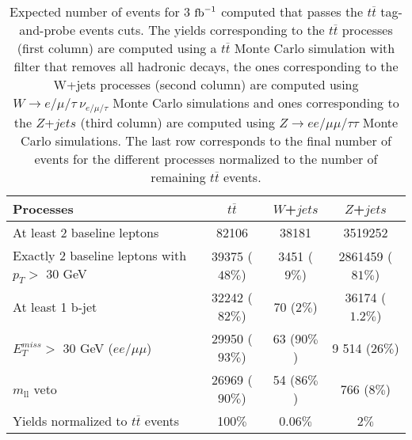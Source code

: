\begin{table}[htb!]
  	\begin{center} 
    		\begin{tabular}{|l|c|c|c|} \hline
				Processes    &   $t\overline{t}$  &  $W$+$jets$   &  $Z$+$jets$ \\ \hline \hline
				At least 2 baseline leptons & 82106 & 38181  & 3519252 \\ 
				Exactly 2 baseline leptons with $p_T >$ 30 GeV & 39375 ($48\%$) & 3451 ($9\%$) & 2861459 ($81\%$) \\
				At least 1 b-jet            & 32242 ($82\%$) & 70 ($2\%$) & 36174 ($1.2\%$) \\
				$E_T^{miss} >$ 30 GeV ($ee$/$\mu\mu$)   & 29950 ($93\%$) & 63 ($90\%$) &9 514 ($26\%$)\\
				$m_{\mathrm{ll}}$ veto                           & 26969 ($90\%$) & 54 ($86\%$) & 766 ($8\%$)\\ \hline
				Yields normalized to $t\overline{t}$ events& 100$\%$ & 0.06$\%$ & 2$\%$\\ \hline
		    \end{tabular}
			\caption{\label{tab:ttbar_TandP_Cutflow} Expected number of events for 3 $\textnormal{fb}^{-1}$ computed that passes the $t\overline{t}$ tag-and-probe events cuts. The yields corresponding to the $t\overline{t}$ processes (first column) are computed using a $t\overline{t}$ Monte Carlo simulation with filter that removes all hadronic decays, the ones corresponding to the W+jets processes (second column) are computed using $W \rightarrow e/\mu/\tau~\nu_{e/\mu/\tau}$ Monte Carlo simulations and ones corresponding to the $Z$+$jets$ (third column) are computed using $Z \rightarrow ee/\mu\mu/\tau\tau$ Monte Carlo simulations. The last row corresponds to the final number of events for the different processes normalized to the number of remaining $t\overline{t}$ events.}
    	\end{center}
    \end{table}		

